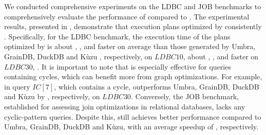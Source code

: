 We conducted comprehensive experiments on the LDBC and JOB benchmarks to comprehensively evaluate the performance of \name compared to . The experimental results, presented in , demonstrate that execution plans optimized by \name consistently .
Specifically, for the LDBC benchmark, the execution time of the plans optimized by \name is about , ,  and  faster on average than those generated by Umbra, GrainDB, DuckDB and K\`uzu , respectively, on $LDBC10$, about , ,  and  faster on $LDBC30$, . It is important to note that \name is especially effective for queries containing cycles, which can benefit more from graph optimizations. For example, in query $IC[7]$, which contains a cycle, \name outperforms Umbra, GrainDB, DuckDB and K\`uzu by , respectively, on $LDBC30$.
Conversely, the JOB benchmark, established for assessing join optimizations in relational databases, lacks any cyclic-pattern queries. Despite this, \name still achieves better performance compared to Umbra, GrainDB, DuckDB and K\`uzu, with an average speedup of , respectively.


